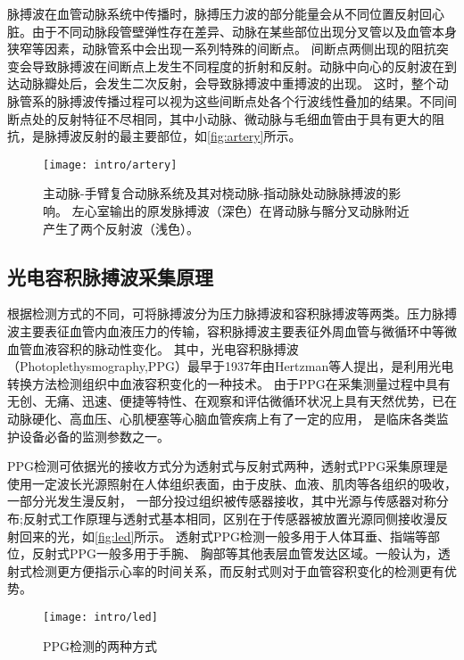 脉搏波在血管动脉系统中传播时，脉搏压力波的部分能量会从不同位置反射回心脏。由于不同动脉段管壁弹性存在差异、动脉在某些部位出现分叉管以及血管本身狭窄等因素，动脉管系中会出现一系列特殊的间断点。
间断点两侧出现的阻抗突变会导致脉搏波在间断点上发生不同程度的折射和反射。动脉中向心的反射波在到达动脉瓣处后，会发生二次反射，会导致脉搏波中重搏波的出现。
这时，整个动脉管系的脉搏波传播过程可以视为这些间断点处各个行波线性叠加的结果\cite{THOCBPM}。不同间断点处的反射特征不尽相同，其中小动脉、微动脉与毛细血管由于具有更大的阻抗，是脉搏波反射的最主要部位，如\autoref{fig:artery}所示。
\begin{figure}[htbp]
    \centering
    \texttt{[image: intro/artery]}
    \caption[主动脉-手臂复合动脉系统及其对桡动脉-指动脉处动脉脉搏波的影响示意图]{\label{fig:artery}主动脉-手臂复合动脉系统及其对桡动脉-指动脉处动脉脉搏波的影响\cite{THOCBPM}。
    左心室输出的原发脉搏波（深色）在肾动脉与髂分叉动脉附近产生了两个反射波（浅色）。}
\end{figure}

\subsection{光电容积脉搏波采集原理}
根据检测方式的不同，可将脉搏波分为压力脉搏波和容积脉搏波等两类。压力脉搏波主要表征血管内血液压力的传输，容积脉搏波主要表征外周血管与微循环中等微血管血液容积的脉动性变化。
其中，光电容积脉搏波（Photoplethysmography,PPG）最早于1937年由Hertzman等人\cite{Hertzman1937}提出，是利用光电转换方法检测组织中血液容积变化的一种技术。
由于PPG在采集测量过程中具有无创、无痛、迅速、便捷等特性、在观察和评估微循环状况上具有天然优势，已在动脉硬化、高血压、心肌梗塞等心脑血管疾病上有了一定的应用，
是临床各类监护设备必备的监测参数之一\cite{PPGYY,Allen2007,THOCBPM,Zhang2010,ldl,lhc}。

PPG检测可依据光的接收方式分为透射式与反射式两种\cite{THOCBPM}，透射式PPG采集原理是使用一定波长光源照射在人体组织表面，由于皮肤、血液、肌肉等各组织的吸收，一部分光发生漫反射，
一部分投过组织被传感器接收，其中光源与传感器对称分布;反射式工作原理与透射式基本相同，区别在于传感器被放置光源同侧接收漫反射回来的光\cite{THOCBPM,mmt}，如\autoref{fig:led}所示。
透射式PPG检测一般多用于人体耳垂、指端等部位，反射式PPG一般多用于手腕、
胸部等其他表层血管发达区域\cite{THOCBPM}。一般认为，透射式检测更方便指示心率的时间关系，而反射式则对于血管容积变化的检测更有优势\cite{mmt}。
\begin{figure}[htbp]
    \centering
    \texttt{[image: intro/led]}
    \caption[PPG检测的两种方式]{\label{fig:led}PPG检测的两种方式\cite{THOCBPM}}
\end{figure}

